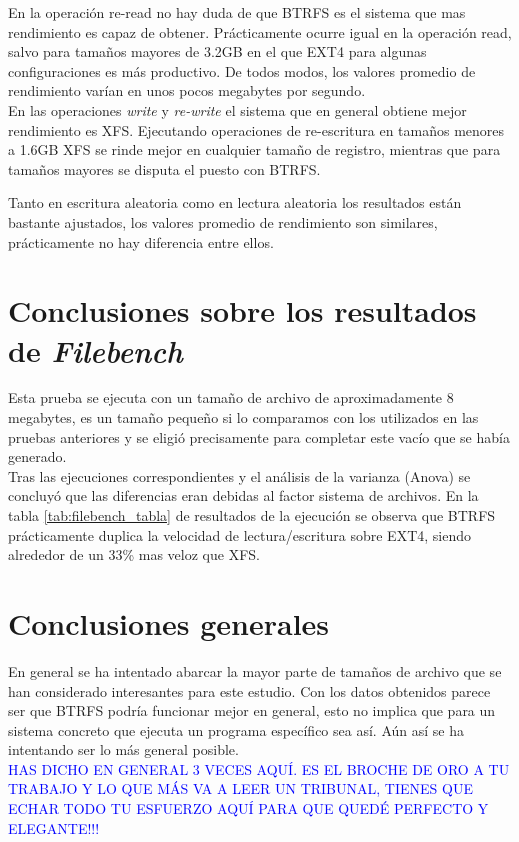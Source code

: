 En la operación re-read no hay duda de que BTRFS es el sistema que mas rendimiento es capaz de obtener. Prácticamente ocurre igual en la operación read, salvo para tamaños mayores de 3.2GB en el que EXT4 para algunas configuraciones es más productivo. De todos modos, los valores promedio de rendimiento varían en unos pocos megabytes por segundo. \\

En las operaciones \textit{write} y \textit{re-write} el sistema que en general obtiene mejor rendimiento es XFS. Ejecutando operaciones de re-escritura en tamaños menores a 1.6GB XFS se rinde mejor en cualquier tamaño de registro, mientras que para tamaños mayores se disputa el puesto con BTRFS.

Tanto en escritura aleatoria como en lectura aleatoria los resultados están bastante ajustados, los valores promedio de rendimiento son similares, prácticamente no hay diferencia entre ellos.

\section{Conclusiones sobre los resultados de \textit{Filebench}}
Esta prueba se ejecuta con un tamaño de archivo de aproximadamente 8 megabytes, es un tamaño pequeño si lo comparamos con los utilizados en las pruebas anteriores y se eligió precisamente para completar este vacío que se había generado.\\

Tras las ejecuciones correspondientes y el análisis de la varianza (Anova) se concluyó que las diferencias eran debidas al factor sistema de archivos. En la tabla \ref{tab:filebench_tabla} de resultados de la ejecución se observa que BTRFS prácticamente duplica la velocidad de lectura/escritura sobre EXT4, siendo alrededor de un 33\% mas veloz que XFS. 

\section{Conclusiones generales}

En general se ha intentado abarcar la mayor parte de tamaños de archivo que se han considerado interesantes para este estudio. Con los datos obtenidos parece ser que BTRFS podría funcionar mejor en general, esto no implica que para un sistema concreto que ejecuta un programa específico sea así. Aún así se ha intentando ser lo más general posible.\\ \textcolor{blue}{HAS DICHO EN GENERAL 3 VECES AQUÍ. ES EL BROCHE DE ORO A TU TRABAJO Y LO QUE MÁS VA A LEER UN TRIBUNAL, TIENES QUE ECHAR TODO TU ESFUERZO AQUÍ PARA QUE QUEDÉ PERFECTO Y ELEGANTE!!!}


